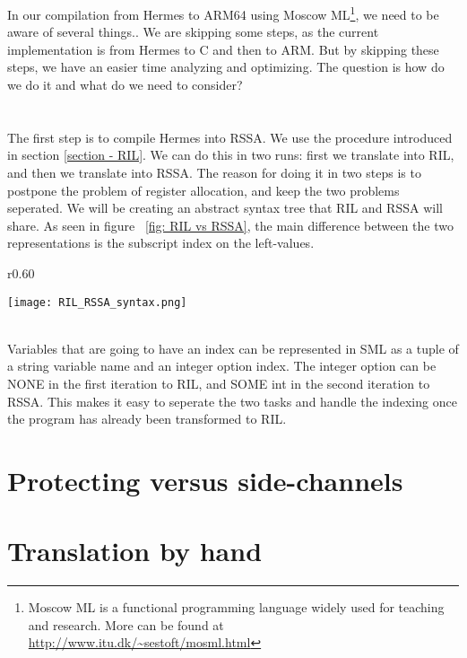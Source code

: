 In our compilation from Hermes to ARM64 using Moscow ML\footnote{Moscow ML is a functional programming language widely used for teaching and research. More can be found at \url{http://www.itu.dk/~sestoft/mosml.html}}, we need to be aware of several things..
We are skipping some steps, as the current implementation is from Hermes to C and then to ARM.
But by skipping these steps, we have an easier time analyzing and optimizing. The question is how do we do it and what do we need to consider?

\section{}
The first step is to compile Hermes into RSSA. We use the procedure introduced in section \ref{section - RIL}.
We can do this in two runs: first we translate into RIL, and then we translate into RSSA.
The reason for doing it in two steps is to postpone the problem of register allocation, and keep the two problems seperated.
We will be creating an abstract syntax tree that RIL and RSSA will share.
As seen in figure ~\ref{fig: RIL vs RSSA}, the main difference between the two representations is the subscript index on the left-values.
\begin{wrapfigure}{r}{0.60\textwidth}
  \begin{center}
    \texttt{[image: RIL\_RSSA\_syntax.png]}
  \end{center}
  \caption[caption]{RIL and RSSA syntax from\cite{10.1007/978-3-319-41579-6_16}}
  \label{fig: RIL vs RSSA}
\end{wrapfigure} \\
Variables that are going to have an index can be represented in SML as a tuple of a string variable name and an integer option index. The integer option can be NONE in the first iteration to RIL, and SOME int in the second iteration to RSSA. This makes it easy to seperate the two tasks and handle the indexing once the program has already been transformed to RIL.

\section{Protecting versus side-channels}


\section{Translation by hand}
